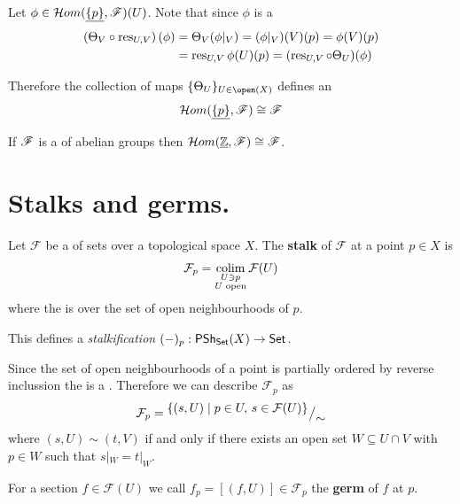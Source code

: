 \documentclass[../main.tex]{subfiles}
\begin{document}
\begin{example}
  Let \(\phi \in \mathcal{H}om(\underline{\{p\}}, \mathscr{F})(U)\).
  Note that since \(\phi\) is a 
  \begin{align*}
    \left( \Theta_{V} \circ \operatorname{res}_{U, V} \right)(\phi) &= \Theta_{V}(\phi|_{V}) = (\phi|_{V})(V)(p) = \phi(V)(p) \\
                                          &= \operatorname{res}_{U, V}\phi(U)(p) = (\operatorname{res}_{U, V} \circ \Theta_{U})(\phi)
  \end{align*}

  Therefore the collection of maps \(\{\Theta_{U}\}_{U \in \open(X)}\) defines an 
  \begin{equation*}
    \mathcal{H}om(\underline{\{p\}}, \mathscr{F}) \cong \mathscr{F}
  \end{equation*}
\end{example}

\begin{example}
  If \(\mathscr{F}\) is a  of abelian groups then \(\mathcal{H}om(\underline{\mathbb{Z}}, \mathscr{F}) \cong \mathscr{F}\).
\end{example}

\section{Stalks and germs.}

\begin{definition}[Stalk] \label{def:stalk}
  Let \(\mathcal{F}\) be a  of sets over a topological space \(X\).
  The \textbf{stalk} of \(\mathcal{F}\) at a point \(p \in X\) is
  \begin{equation*}
    \mathcal{F}_{p} = \operatorname*{colim}_{\substack{U \ni p \\ U \text{ open}}} \mathcal{F}(U)
  \end{equation*}
  where the  is over the set of open neighbourhoods of \(p\).

  This defines a \textit{stalkification } \((-)_{p}: \mathsf{PSh}_{\mathsf{Set}}(X) \to \mathsf{Set}\).
\end{definition}
\begin{remark} \label{remark:stalk}
  Since the set of open neighbourhoods of a point is partially ordered by reverse inclussion the   is a .
  Therefore we can describe \(\mathcal{F}_{p}\) as
  \begin{equation*}
    \mathcal{F}_{p} = {^{\textstyle \{(s, U) \mid p \in U, \, s \in \mathcal{F}(U)\}}\big/_{\textstyle \sim}}
  \end{equation*}
  where \((s, U) \sim (t, V)\) if and only if there exists an open set \(W \subseteq U \cap V\) with \(p \in W\) such that \(s|_{W} = t|_{W}\).

  For a section \(f \in \mathcal{F}(U)\) we call \(f_{p} = [(f, U)] \in \mathcal{F}_{p}\) the \textbf{germ} of \(f\) at \(p\).
\end{remark}
\end{document}
